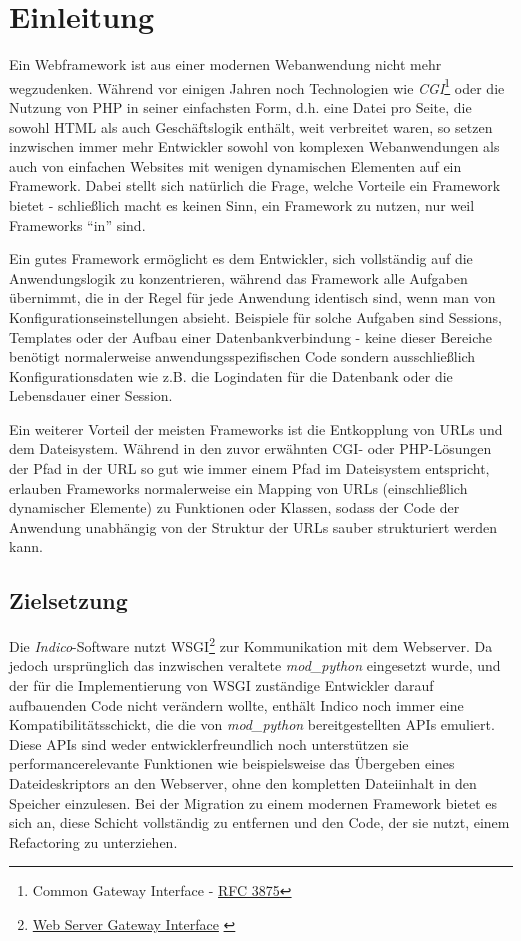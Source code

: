 \chapter{Einleitung}

Ein Webframework ist aus einer modernen Webanwendung nicht mehr wegzudenken. Während vor einigen
Jahren noch Technologien wie \emph{CGI}\footnote{Common Gateway Interface -
\href{http://www.ietf.org/rfc/rfc3875}{RFC 3875}\citep{rfc3875}} oder die Nutzung von PHP in seiner
einfachsten Form, d.h. eine Datei pro Seite, die sowohl HTML als auch Geschäftslogik enthält, weit
verbreitet waren, so setzen inzwischen immer mehr Entwickler sowohl von komplexen Webanwendungen als
auch von einfachen Websites mit wenigen dynamischen Elementen auf ein Framework. Dabei stellt sich
natürlich die Frage, welche Vorteile ein Framework bietet - schließlich macht es keinen Sinn, ein
Framework zu nutzen, nur weil Frameworks \enquote{in} sind.

Ein gutes Framework ermöglicht es dem Entwickler, sich vollständig auf die Anwendungslogik zu
konzentrieren, während das Framework alle Aufgaben übernimmt, die in der Regel für jede Anwendung
identisch sind, wenn man von Konfigurationseinstellungen absieht. Beispiele für solche Aufgaben sind
Sessions, Templates oder der Aufbau einer Datenbankverbindung - keine dieser Bereiche benötigt
normalerweise anwendungsspezifischen Code sondern ausschließlich Konfigurationsdaten wie z.B. die
Logindaten für die Datenbank oder die Lebensdauer einer Session.

Ein weiterer Vorteil der meisten Frameworks ist die Entkopplung von URLs und dem Dateisystem.
Während in den zuvor erwähnten CGI- oder PHP-Lösungen der Pfad in der URL so gut wie immer einem
Pfad im Dateisystem entspricht, erlauben Frameworks normalerweise ein Mapping von URLs
(einschließlich dynamischer Elemente) zu Funktionen oder Klassen, sodass der Code der Anwendung
unabhängig von der Struktur der URLs sauber strukturiert werden kann.


\section{Zielsetzung}

Die \emph{Indico}-Software nutzt WSGI\footnote{\href{http://www.python.org/dev/peps/pep-0333/}{Web
Server Gateway Interface} \citep{wsgi}} zur Kommunikation mit dem Webserver. Da jedoch ursprünglich
das inzwischen veraltete \emph{mod\_python} eingesetzt wurde, und der für die Implementierung von
WSGI zuständige Entwickler darauf aufbauenden Code nicht verändern wollte, enthält Indico noch immer
eine Kompatibilitätsschickt, die die von \emph{mod\_python} bereitgestellten APIs emuliert. Diese
APIs sind weder entwicklerfreundlich noch unterstützen sie performancerelevante Funktionen wie
beispielsweise das Übergeben eines Dateideskriptors an den Webserver, ohne den kompletten
Dateiinhalt in den Speicher einzulesen. Bei der Migration zu einem modernen Framework bietet es sich
an, diese Schicht vollständig zu entfernen und den Code, der sie nutzt, einem Refactoring zu
unterziehen.

